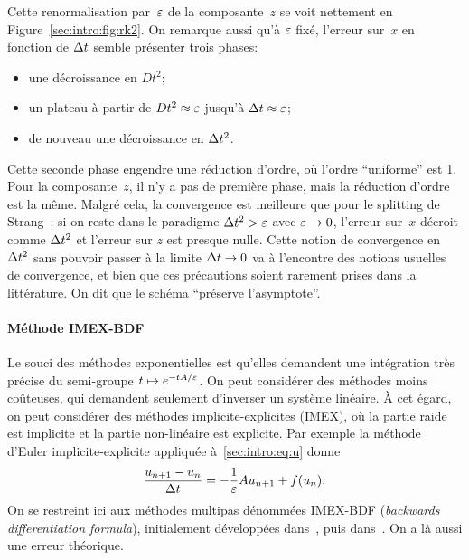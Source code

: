 Cette renormalisation par~$\varepsilon$ de la composante~$z$ se voit nettement en Figure~\ref{sec:intro:fig:rk2}. On remarque aussi qu'à $\varepsilon$ fixé, l'erreur sur~$x$ en fonction de $\Delta t$ semble présenter trois phases:
\begin{itemize}
    \item une décroissance en $Dt^2$;
    \item un plateau à partir de $Dt^2 \approx \varepsilon$ jusqu'à $\Delta t \approx \varepsilon$;
    \item de nouveau une décroissance en $\Delta t^2$.
\end{itemize}
Cette seconde phase engendre une réduction d'ordre, où l'ordre \enquote{uniforme} est 1. Pour la composante~$z$, il n'y a pas de première phase, mais la réduction d'ordre est la même. Malgré cela, la convergence est meilleure que pour le splitting de Strang~: si on reste dans le paradigme $\Delta t^2 > \varepsilon$ avec $\varepsilon \rightarrow 0$, l'erreur sur~$x$ décroit comme $\Delta t^2$ et l'erreur sur $z$ est presque nulle. Cette notion de convergence en $\Delta t^2$ sans pouvoir passer à la limite $\Delta t \rightarrow 0$ va à l'encontre des notions usuelles de convergence, et bien que ces précautions soient rarement prises dans la littérature. On dit que le schéma \enquote{préserve l'asymptote}.




\paragraph{Méthode IMEX-BDF\\}


Le souci des méthodes exponentielles est qu'elles demandent une intégration très précise du semi-groupe $t \mapsto e^{-tA/\varepsilon}$. On peut considérer des méthodes moins coûteuses, qui demandent seulement d'inverser un système linéaire. À cet égard, on peut considérer des méthodes implicite-explicites (IMEX), où la partie raide est implicite et la partie non-linéaire est explicite. Par exemple la méthode d'Euler implicite-explicite appliquée à~\eqref{sec:intro:eq:u} donne
\begin{equation*}
    \frac{u_{n+1} - u_n}{\Delta t} = -\frac{1}{\varepsilon}A u_{n+1} + f(u_n) .
\end{equation*}
On se restreint ici aux méthodes multipas dénommées IMEX-BDF (\textit{backwards differentiation formula}), initialement développées dans~\cite{crouzeix.1980.methode}, puis dans~\cite{ascher.1995.implicit,akrivis.1999.implicit,hundsdorfer.2007.imex,dimarco.2017.implicit}. On a là aussi une erreur théorique.

